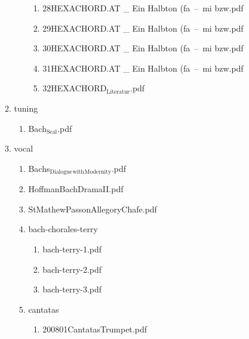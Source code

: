 \documentclass[11pt]{article}
\begin{document}
\begin{enumerate}
\begin{enumerate}
\begin{enumerate}
\begin{enumerate}
\item 28HEXACHORD.AT \_ Ein Halbton (fa – mi bzw.pdf
\label{sec-1-1-1-1-31-7-2-8-1-28}

\item 29HEXACHORD.AT \_ Ein Halbton (fa – mi bzw.pdf
\label{sec-1-1-1-1-31-7-2-8-1-29}

\item 30HEXACHORD.AT \_ Ein Halbton (fa – mi bzw.pdf
\label{sec-1-1-1-1-31-7-2-8-1-30}

\item 31HEXACHORD.AT \_ Ein Halbton (fa – mi bzw.pdf
\label{sec-1-1-1-1-31-7-2-8-1-31}

\item 32HEXACHORD$_{\text{Literatur}}$.pdf
\label{sec-1-1-1-1-31-7-2-8-1-32}
\end{enumerate}
\end{enumerate}

\item tuning
\label{sec-1-1-1-1-31-7-2-9}
\begin{enumerate}
\item Bach$_{\text{Seal}}$.pdf
\label{sec-1-1-1-1-31-7-2-9-1}
\end{enumerate}

\item vocal
\label{sec-1-1-1-1-31-7-2-10}
\begin{enumerate}
\item Bachs$_{\text{Dialogue}}$$_{\text{with}}$$_{\text{Modernity}}$.pdf
\label{sec-1-1-1-1-31-7-2-10-1}

\item HoffmanBachDramaII.pdf
\label{sec-1-1-1-1-31-7-2-10-2}

\item StMathewPassonAllegoryChafe.pdf
\label{sec-1-1-1-1-31-7-2-10-3}

\item bach-chorales-terry
\label{sec-1-1-1-1-31-7-2-10-4}
\begin{enumerate}
\item bach-terry-1.pdf
\label{sec-1-1-1-1-31-7-2-10-4-1}

\item bach-terry-2.pdf
\label{sec-1-1-1-1-31-7-2-10-4-2}

\item bach-terry-3.pdf
\label{sec-1-1-1-1-31-7-2-10-4-3}
\end{enumerate}

\item cantatas
\label{sec-1-1-1-1-31-7-2-10-5}
\begin{enumerate}
\item 200801CantatasTrumpet.pdf
\label{sec-1-1-1-1-31-7-2-10-5-1}


\end{enumerate}
\end{enumerate}
\end{enumerate}
\end{enumerate}
\end{document}
